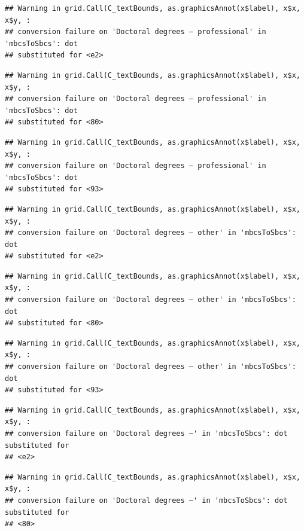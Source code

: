 \documentclass[
]{book}
\begin{document}
\begin{verbatim}
## Warning in grid.Call(C_textBounds, as.graphicsAnnot(x$label), x$x, x$y, :
## conversion failure on 'Doctoral degrees – professional' in 'mbcsToSbcs': dot
## substituted for <e2>
\end{verbatim}

\begin{verbatim}
## Warning in grid.Call(C_textBounds, as.graphicsAnnot(x$label), x$x, x$y, :
## conversion failure on 'Doctoral degrees – professional' in 'mbcsToSbcs': dot
## substituted for <80>
\end{verbatim}

\begin{verbatim}
## Warning in grid.Call(C_textBounds, as.graphicsAnnot(x$label), x$x, x$y, :
## conversion failure on 'Doctoral degrees – professional' in 'mbcsToSbcs': dot
## substituted for <93>
\end{verbatim}

\begin{verbatim}
## Warning in grid.Call(C_textBounds, as.graphicsAnnot(x$label), x$x, x$y, :
## conversion failure on 'Doctoral degrees – other' in 'mbcsToSbcs': dot
## substituted for <e2>
\end{verbatim}

\begin{verbatim}
## Warning in grid.Call(C_textBounds, as.graphicsAnnot(x$label), x$x, x$y, :
## conversion failure on 'Doctoral degrees – other' in 'mbcsToSbcs': dot
## substituted for <80>
\end{verbatim}

\begin{verbatim}
## Warning in grid.Call(C_textBounds, as.graphicsAnnot(x$label), x$x, x$y, :
## conversion failure on 'Doctoral degrees – other' in 'mbcsToSbcs': dot
## substituted for <93>
\end{verbatim}

\begin{verbatim}
## Warning in grid.Call(C_textBounds, as.graphicsAnnot(x$label), x$x, x$y, :
## conversion failure on 'Doctoral degrees –' in 'mbcsToSbcs': dot substituted for
## <e2>
\end{verbatim}

\begin{verbatim}
## Warning in grid.Call(C_textBounds, as.graphicsAnnot(x$label), x$x, x$y, :
## conversion failure on 'Doctoral degrees –' in 'mbcsToSbcs': dot substituted for
## <80>
\end{verbatim}
\end{document}
